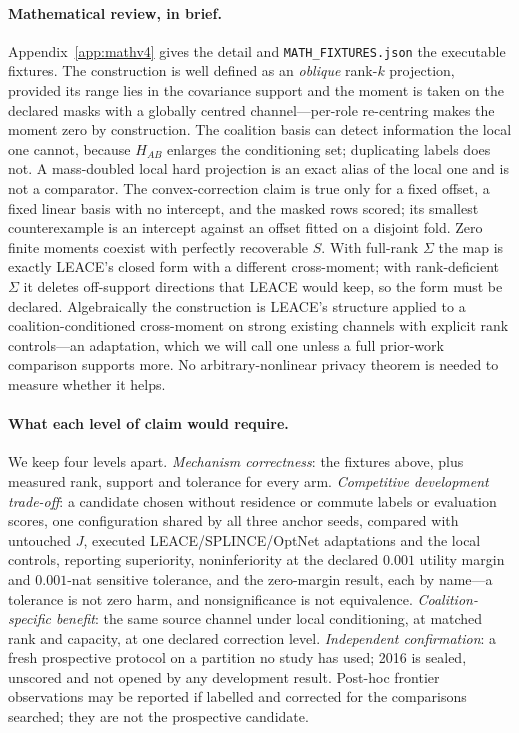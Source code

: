 \documentclass[10pt]{article}
\begin{document}
\paragraph{Mathematical review, in brief.} Appendix~\ref{app:mathv4} gives the detail and
\texttt{MATH\_FIXTURES.json} the executable fixtures. The construction is well defined as an \emph{oblique}
rank-$k$ projection, provided its range lies in the covariance support and the moment is taken on the
declared masks with a globally centred channel---per-role re-centring makes the moment zero by
construction. The coalition basis can detect information the local one cannot, because $H_{AB}$ enlarges
the conditioning set; duplicating labels does not. A mass-doubled local hard projection is an exact alias
of the local one and is not a comparator. The convex-correction claim is true only for a fixed offset, a
fixed linear basis with no intercept, and the masked rows scored; its smallest counterexample is an
intercept against an offset fitted on a disjoint fold. Zero finite moments coexist with perfectly
recoverable $S$. With full-rank $\Sigma$ the map is exactly LEACE's closed form with a different cross-moment; with
rank-deficient $\Sigma$ it deletes off-support directions that LEACE would keep, so the form must be
declared. Algebraically the construction is LEACE's structure applied to a coalition-conditioned
cross-moment on strong existing channels with explicit rank controls---an adaptation, which we will call
one unless a full prior-work comparison supports more. No arbitrary-nonlinear privacy theorem is needed to
measure whether it helps.

\paragraph{What each level of claim would require.} We keep four levels apart. \emph{Mechanism
correctness}: the fixtures above, plus measured rank, support and tolerance for every arm.
\emph{Competitive development trade-off}: a candidate chosen without residence or commute labels or
evaluation scores, one configuration shared by all three anchor seeds, compared with untouched $J$,
executed LEACE/SPLINCE/OptNet adaptations and the local controls, reporting superiority, noninferiority
at the declared $0.001$ utility margin and $0.001$-nat sensitive tolerance, and the zero-margin result,
each by name---a tolerance is not zero harm, and nonsignificance is not equivalence. \emph{Coalition-specific
benefit}: the same source channel under local conditioning, at matched rank and capacity, at one declared
correction level. \emph{Independent confirmation}: a fresh prospective protocol on a partition no study has
used; 2016 is sealed, unscored and not opened by any development result. Post-hoc frontier observations
may be reported if labelled and corrected for the comparisons searched; they are not the prospective
candidate.
\end{document}
